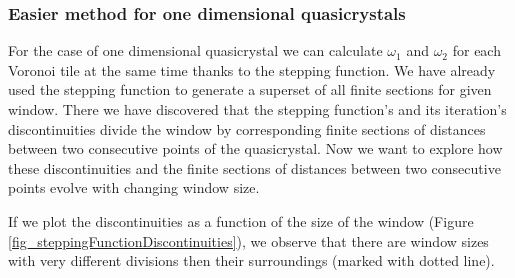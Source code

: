 \documentclass[text.tex]{subfiles}
\begin{document}
\subsubsection{Easier method for one dimensional quasicrystals}
For the case of one dimensional quasicrystal we can calculate $\omega_1$ and $\omega_2$ for each Voronoi tile at the same time thanks to the stepping function. We have already used the stepping function to generate a superset of all finite sections for given window. There we have discovered that the stepping function's and its iteration's discontinuities divide the window by corresponding finite sections of distances between two consecutive points of the quasicrystal. Now we want to explore how these discontinuities and the finite sections of distances between two consecutive points evolve with changing window size. 

If we plot the discontinuities as a function of the size of the window (Figure \ref{fig_steppingFunctionDiscontinuities}), we observe that there are window sizes with very different divisions then their surroundings (marked with dotted line). 
\end{document}
